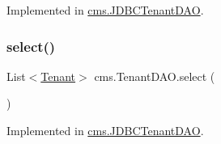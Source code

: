 Implemented in \mbox{\hyperlink{classcms_1_1_j_d_b_c_tenant_d_a_o_a76c9d02d8ea133d2f38744f15726ace9}{cms.\+J\+D\+B\+C\+Tenant\+D\+AO}}.

\mbox{\label{interfacecms_1_1_tenant_d_a_o_ab87faa632f84a2592f6f1b9bcb1ef2fe}} 
\subsubsection{\texorpdfstring{select()}{select()}}
{\footnotesize\ttfamily List$<$\mbox{\hyperlink{classcms_1_1_tenant}{Tenant}}$>$ cms.\+Tenant\+D\+A\+O.\+select (\begin{DoxyParamCaption}{ }\end{DoxyParamCaption})}



Implemented in \mbox{\hyperlink{classcms_1_1_j_d_b_c_tenant_d_a_o_ac021642b8b94d054fbdc74cd87b4a98d}{cms.\+J\+D\+B\+C\+Tenant\+D\+AO}}.

